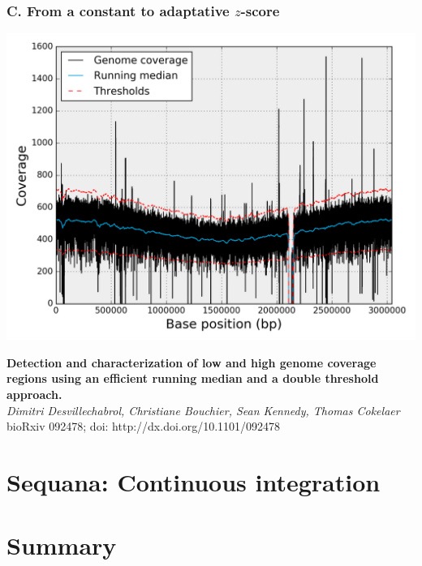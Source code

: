 \documentclass{beamer}
\begin{document}
\begin{frame}
\frametitle{C. From a constant to adaptative $z$-score}
\includegraphics[height=0.9\textheight, width=1\textwidth]{images/fig3.png}
 \end{frame}



 \begin{frame}
\textbf{Detection and characterization of low and high genome coverage 
regions using an efficient running median and a double threshold approach.}
\\
\vspace{.4cm}
\textit{Dimitri Desvillechabrol, Christiane Bouchier, Sean Kennedy, Thomas
Cokelaer}
\\
\vspace{.4cm}
bioRxiv 092478; doi: http://dx.doi.org/10.1101/092478
\end{frame}


 

\section{Sequana: Continuous integration}


\section{Summary}
\end{document}
